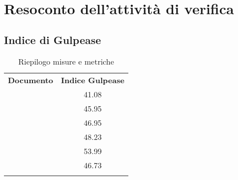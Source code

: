 \documentclass[../PianoDiQualifica.tex]{subfiles}
\begin{document}
	\section{Resoconto dell'attività di verifica}
		\subsection{Indice di Gulpease}
		\begin{table}[H]
			\center
			\begin{tabular}{!{\VRule[1.4pt]}l!{\VRule}c!{\VRule[1.4pt]}}
				\textbf{Documento} & \textbf{Indice Gulpease} \\
				\analisideirequisitiRR & 41.08 \\ \hline
				\glossarioRR & 45.95 \\ \hline
				\normediprogettoRR & 46.95 \\ \hline
				\pianodiprogettoRR & 48.23 \\ \hline
				\pianodiqualificaRR & 53.99 \\ \hline
				\studiodifattibilitaRR & 46.73 \\ \hline

			\end{tabular}
			\caption{Riepilogo misure e metriche}
		\end{table}
\end{document}
